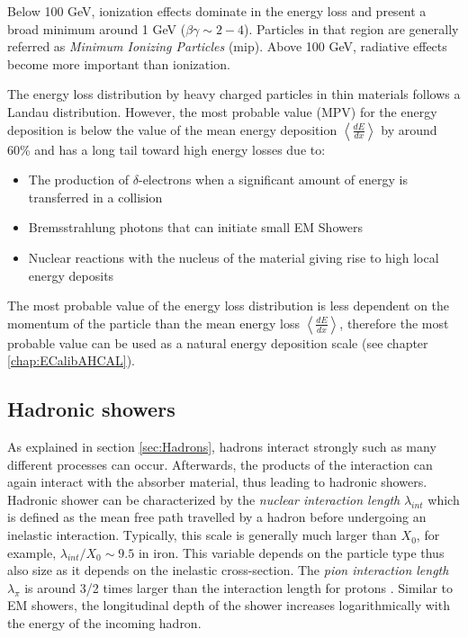 Below 100 GeV, ionization effects dominate in the energy loss and present a broad minimum around 1 GeV ($\beta\gamma \sim 2-4$). Particles in that region are generally referred as \textit{Minimum Ionizing Particles} (\acrshort{mip}). Above 100 GeV, radiative effects become more important than ionization.

The energy loss distribution by heavy charged particles in thin materials follows a Landau distribution. However, the most probable value (MPV) for the energy deposition is below the value of the mean energy deposition $\left<\frac{dE}{dx}\right>$ by around 60\% and has a long tail toward high energy losses due to:
\begin{itemize}
  \item The production of $\delta$-electrons when a significant amount of energy is transferred in a collision
  \item Bremsstrahlung photons that can initiate small EM Showers
  \item Nuclear reactions with the nucleus of the material giving rise to high local energy deposits
\end{itemize}
The most probable value of the energy loss distribution is less dependent on the momentum of the particle than the mean energy loss $\left<\frac{dE}{dx}\right>$, therefore the most probable value can be used as a natural energy deposition scale (see chapter \ref{chap:ECalibAHCAL}).

\subsection{Hadronic showers}
\label{subsec:HadShowers}

As explained in section \ref{sec:Hadrons}, hadrons interact strongly such as many different processes can occur. Afterwards, the products of the interaction can again interact with the absorber material, thus leading to hadronic showers. Hadronic shower can be characterized by the \textit{nuclear interaction length} $\lambda_{int}$ which is defined as the mean free path travelled by a hadron before undergoing an inelastic interaction. Typically, this scale is generally much larger than $X_0$, for example, $\lambda_{int}/X_0 \sim 9.5$ in iron. This variable depends on the particle type thus also size as it depends on the inelastic cross-section. The \textit{pion interaction length} $\lambda_{\pi}$ is around 3/2 times larger than the interaction length for protons \cite{Wigmans:392793}. Similar to EM showers, the longitudinal depth of the shower increases logarithmically with the energy of the incoming hadron.

